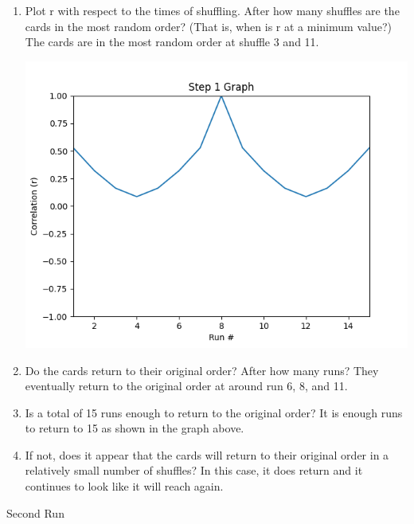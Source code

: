 \documentclass[12pt]{article}
\begin{document}
    \begin{enumerate}
        \item Plot r with respect to the times of shuffling. After how many shuffles are the cards 
        in the most random order? (That is, when is r at a minimum value?)
        \subitem The cards are in the most random order at shuffle 3 and 11.\\
        \begin{minipage}[t]{\linewidth}
            \centering
            {
              \includegraphics[width=.7\linewidth]{Figure_1.png}
            }
            \medskip       
        \end{minipage}
        \item Do the cards return to their original order?  After how many runs?
        \subitem They eventually return to the original order at around run 6, 8, and 11.
        \item Is a total of 15 runs enough to return to the original order?
        \subitem It is enough runs to return to 15 as shown in the graph above.
        \item If not, does it appear that the cards will return to their original order in a relatively 
        small number of shuffles?
        \subitem In this case, it does return and it continues to look like it will reach again.
    \end{enumerate}
    \newpage
    \begin{center}
        \small Second Run
    \end{center}
\end{document}
